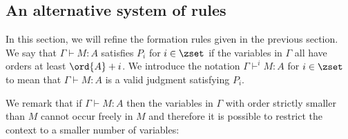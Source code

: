 \subsection{An alternative system of rules}


In this section, we will refine the formation rules
given in the previous section. We say that $\Gamma \vdash M : A$ satisfies $P_i$ for $i \in \zset$ if the
variables in $\Gamma$ all have orders at least $\ord{A}+i$. We introduce the notation $\Gamma \vdash^{i} M : A$ for $i \in
\zset$ to mean that $\Gamma \vdash M : A$ is a valid judgment satisfying $P_i$.


We remark that if $\Gamma \vdash M : A$ then the variables in $\Gamma$ with order
strictly smaller than $M$ cannot occur freely in $M$ and therefore it is possible to restrict
the context to a smaller number of variables:

